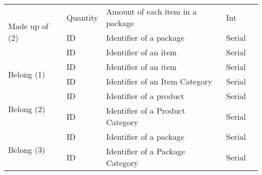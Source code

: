 \begin{longtable}{|p{}|p{} |p{}|p{}|p{} |}
\multirow{3}{*}{Made up of (2)} & Quantity & Amount of each item in a package & Int &  \\\cline{2-5}
& ID & Identifier of a package & Serial & \\\cline{2-5}
& ID & Identifier of an item & Serial & \\\hline


\multirow{2}{*}{Belong (1)} & ID & Identifier of an item & Serial & \\\cline{2-5}
& ID & Identifier of an Item Category & Serial & \\\hline

\multirow{2}{*}{Belong (2)} & ID & Identifier of a product & Serial & \\\cline{2-5}
& ID & Identifier of a Product Category & Serial & \\\hline

\multirow{2}{*}{Belong (3)} & ID & Identifier of a package & Serial & \\\cline{2-5}
& ID & Identifier of a Package Category & Serial & \\\hline

\end{longtable}